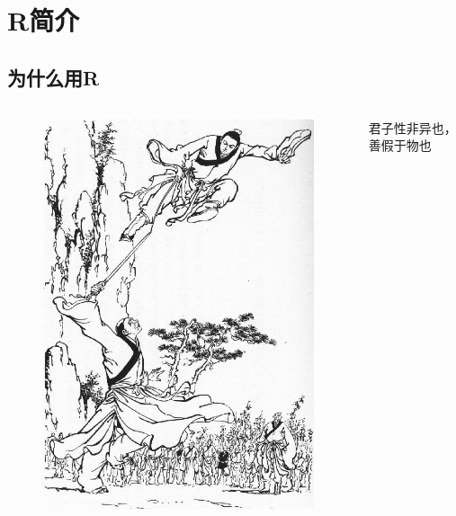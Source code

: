 \documentclass{beamerthemeMono}
\begin{document}
\section{R简介}
\subsection{为什么用R}
\begin{frame}{\subsecname}{}

  \begin{columns}
    \begin{column}{.5\textwidth}
      \begin{figure}
        \centering \includegraphics[width=0.9\columnwidth]{乾坤大挪移.jpg}
      \end{figure}
    \end{column}

    \begin{column}{.48\textwidth}
      \begin{ornamentblock}
        \centering
        {君子性非异也，善假于物也\\
          }
      \end{ornamentblock}
    \end{column}
  \end{columns}
\end{frame}
\end{document}
